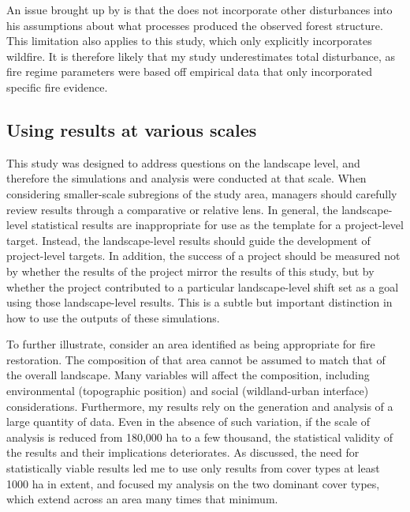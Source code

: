 An issue brought up by \citet{Fule2014} is that the \citep{Baker2014} does not incorporate other disturbances into his assumptions about what processes produced the observed forest structure. This limitation also applies to this study, which only explicitly incorporates wildfire. It is therefore likely that my study underestimates total disturbance, as fire regime parameters were based off empirical data that only incorporated specific fire evidence.


\subsection{Using results at various scales}
This study was designed to address questions on the landscape level, and therefore the simulations and analysis were conducted at that scale. When considering smaller-scale subregions of the study area, managers should carefully review results through a comparative or relative lens. In general, the landscape-level statistical results are inappropriate for use as the template for a project-level target. Instead, the landscape-level results should guide the development of project-level targets. In addition, the success of a project should be measured not by whether the results of the project mirror the results of this study, but by whether the project contributed to a particular landscape-level shift set as a goal using those landscape-level results. This is a subtle but important distinction in how to use the outputs of these simulations. 

To further illustrate, consider an area identified as being appropriate for fire restoration. The composition of that area cannot be assumed to match that of the overall landscape. Many variables will affect the composition, including environmental (topographic position) and social (wildland-urban interface) considerations. Furthermore, my results rely on the generation and analysis of a large quantity of data. Even in the absence of such variation, if the scale of analysis is reduced from 180,000 ha to a few thousand, the statistical validity of the results and their implications deteriorates. As discussed, the need for statistically viable results led me to use only results from cover types at least 1000 ha in extent, and focused my analysis on the two dominant cover types, which extend across an area many times that minimum.


